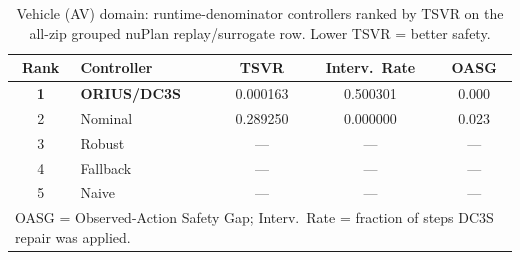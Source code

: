 \begin{table}[htbp]
\centering\small
\caption{Vehicle (AV) domain: runtime-denominator controllers ranked by TSVR on the all-zip grouped nuPlan replay/surrogate row. Lower TSVR = better safety.}
\label{tab:vehicle_leaderboard}
\begin{tabular}{clccc}
\toprule
\textbf{Rank} & \textbf{Controller} & \textbf{TSVR} & \textbf{Interv.\ Rate} & \textbf{OASG} \\
\midrule
\textbf{1} & \textbf{ORIUS/DC3S} & 0.000163 & 0.500301 & 0.000 \\
2 & Nominal & 0.289250 & 0.000000 & 0.023 \\
3 & Robust & --- & --- & --- \\
4 & Fallback & --- & --- & --- \\
5 & Naive & --- & --- & --- \\
\bottomrule
\multicolumn{5}{l}{\small OASG = Observed-Action Safety Gap; Interv.\ Rate = fraction of steps DC3S repair was applied.}\\
\end{tabular}
\end{table}
